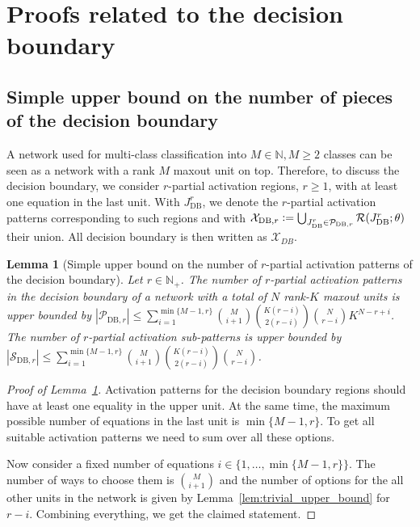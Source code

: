 \documentclass{article}
\newtheorem{lemma}[theorem]{Lemma}
\theoremstyle{definition}
\newcommand{\defeq}{\vcentcolon=}
\begin{document}
\section{Proofs related to the decision boundary}
\label{app:decision_boundary}

\subsection{Simple upper bound on the number of pieces of the decision boundary}
A network used for multi-class classification into $M \in \mathbb{N}, M \geq 2$ classes can be seen as a network with a rank $M$ maxout unit on top.
Therefore, to discuss the decision boundary, we consider $r$-partial activation regions, $r \geq 1$, with at least one equation in the last unit. 
With $J_{\text{DB}}^r$, we denote the $r$-partial activation patterns corresponding to such regions and with $\mathcal{X}_{\text{DB}, r} \defeq \bigcup_{J_{\text{DB}}^r \in \mathcal{P}_{\text{DB}, r}} \mathcal{R}(J_{\text{DB}}^r; \theta)$ their union.
All decision boundary is then written as $\mathcal{X}_{DB}$. 

\begin{lemma}[Simple upper bound on the number of $r$-partial activation patterns of the decision boundary]
    \label{lem:decision_patterns}
    Let $r\in\mathbb{N}_+$. The number of $r$-partial activation patterns in the decision boundary of a network with a total of $N$ rank-$K$ maxout units is upper bounded by $|\mathcal{P}_{\text{DB}, r}| \leq \sum_{i = 1} ^{\min\{M - 1, r\}}  \binom{M}{i + 1} \binom{K(r - i)}{2 (r - i)} \binom{N}{r - i} K^{N - r + i}$. 
    The number of $r$-partial activation sub-patterns is upper bounded by $|\mathcal{S}_{\text{DB}, r}|\leq \sum_{i = 1} ^{\min\{M - 1, r\}}  \binom{M}{i + 1} \binom{K(r - i)}{2 (r - i)} \binom{N}{r - i}$. 
\end{lemma}
\begin{proof}[Proof of Lemma~\ref{lem:decision_patterns}]
    Activation patterns for the decision boundary regions should have at least one equality in the upper unit.
    At the same time, the maximum possible number of equations in the last unit is $\min\{M - 1, r\}$.
    To get all suitable activation patterns we need to sum over all these options. 
    
    Now consider a fixed number of equations $i \in \{1, \dots, \min\{M - 1, r\}\}$. The number of ways to choose them is $\binom{M}{i + 1}$ and the number of options for the all other units in the network is given by Lemma~\ref{lem:trivial_upper_bound} for $r - i$. Combining everything, we get the claimed statement. 
\end{proof}
\end{document}
